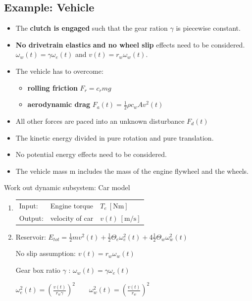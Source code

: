 \documentclass[10pt,a4paper]{scrartcl}
\begin{document}
\begin{multicols*}{3}
\begin{enumerate}
\end{enumerate}

\subsection{Example: Vehicle}


\begin{itemize}
\item The \textbf{clutch is engaged} such that the gear ration $\gamma$ is piecewise constant.
\item \textbf{No drivetrain elastics} \textbf{and no wheel slip} effects need to be considered. $\omega_w (t)=\gamma \omega_e(t)$ and $v(t)=r_{w}\omega_w(t)$.
\item The vehicle has to overcome:
\begin{itemize}
\item \textbf{rolling friction} $F_r=c_rmg$
\item \textbf{aerodynamic drag} $F_a(t)=\frac{1}{2}\rho c_w Av^2(t)$
\end{itemize}
\item All other forces are paced into an unknown disturbance $F_d(t)$
\item The kinetic energy divided in pure rotation and pure translation.
\item No potential energy effects need to be considered.
\item The vehicle mass m includes the mass of the engine flywheel and the wheels.
\end{itemize}


Work out dynamic subsystem: Car model
\begin{enumerate}
\item \begin{tabular}{lll}Input: & Engine torque & $T_e\ [\si{\newton\meter}]$\\
Output: & velocity of car & $v(t)\ [\si{\meter\per\second}]$ \end{tabular}
\item Reservoir: $E_{tot}=\frac{1}{2}mv^2(t)+\frac{1}{2}\Theta_e\omega_e^2(t)+4\frac{1}{2}\Theta_w\omega_w^2(t)$

No slip assumption: $v(t)=r_w\omega_w(t)$

Gear box ratio $\gamma$ : $\omega_w(t)=\gamma\omega_e(t)$

$\omega_e^2(t)=\left(\frac{v(t)}{r_w\gamma}\right)^2\qquad \omega_w^2(t)=\left(\frac{v(t)}{r_w}\right)^2$


\end{enumerate}
\end{multicols*}
\end{document}
